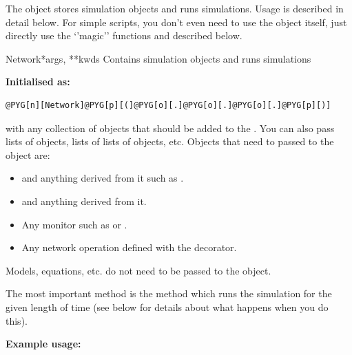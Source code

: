 \documentclass[letterpaper,10pt,english]{manual}
\begin{document}
The \hyperlink{brian.Network}{} object stores simulation objects and runs simulations. Usage
is described in detail below. For simple scripts, you don't even need to
use the \hyperlink{brian.Network}{} object itself, just directly use the `'magic'' functions
\hyperlink{brian.run}{} and \hyperlink{brian.reinit}{} described below.

\hypertarget{brian.Network}{}\begin{classdesc}{Network}{*args, **kwds}
Contains simulation objects and runs simulations

\textbf{Initialised as:}

\begin{Verbatim}[commandchars=@\[\]]
@PYG[n][Network]@PYG[p][(]@PYG[o][.]@PYG[o][.]@PYG[o][.]@PYG[p][)]
\end{Verbatim}

with  any collection of objects that should be added to the \hyperlink{brian.Network}{}.
You can also pass lists of objects, lists of lists of objects, etc. Objects
that need to passed to the \hyperlink{brian.Network}{} object are:
\begin{itemize}
\item {} 
\hyperlink{brian.NeuronGroup}{} and anything derived from it such as \hyperlink{brian.PoissonGroup}{}.

\item {} 
\hyperlink{brian.Connection}{} and anything derived from it.

\item {} 
Any monitor such as \hyperlink{brian.SpikeMonitor}{} or \hyperlink{brian.StateMonitor}{}.

\item {} 
Any network operation defined with the \hyperlink{brian.network_operation}{} decorator.

\end{itemize}

Models, equations, etc. do not need to be passed to the \hyperlink{brian.Network}{} object.

The most important method is the  method which runs the simulation
for the given length of time (see below for details about what happens when you
do this).

\textbf{Example usage:}


\end{classdesc}
\end{document}
